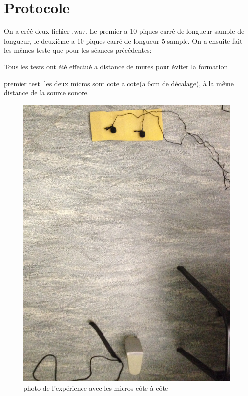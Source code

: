 \documentclass[12pt,a4paper]{article}
\begin{document}
\section{Protocole}
	On a créé deux fichier .wav. Le premier a 10 piques carré de longueur sample de longueur, le deuxième a 10 piques carré de longueur 5 sample.
	On a ensuite fait les mêmes teste que pour les séances précédentes:

	Tous les tests ont été effectué a distance de mures pour éviter la formation 

	premier test:
		les deux micros sont cote a cote(a 6cm de décalage), à la même distance de la source sonore.
\begin{figure}[H]
		\includegraphics[width=\textwidth]{../donnees11-03/test_1.jpg} 
		\caption{photo de l'expérience avec les micros côte à côte}
\end{figure}
		
\end{document}
